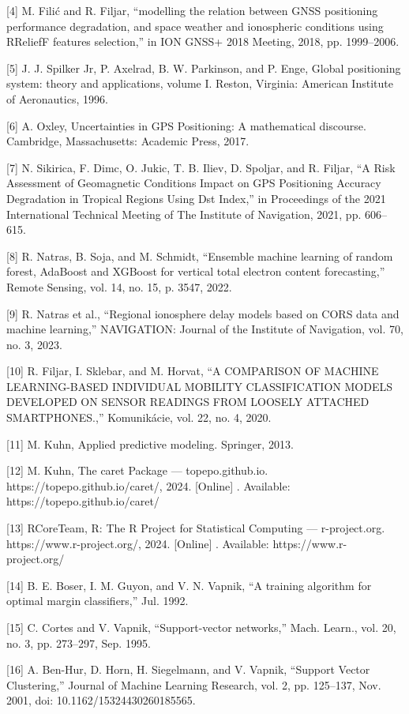 \documentclass[sn-mathphys-num]{sn-jnl}%
\begin{document}
[4] M. Filić and R. Filjar, “modelling the relation between GNSS positioning performance degradation, and space weather and ionospheric conditions using RReliefF features selection,” in ION GNSS+ 2018 Meeting, 2018, pp. 1999–2006.

[5] J. J. Spilker Jr, P. Axelrad, B. W. Parkinson, and P. Enge, Global positioning system: theory and applications, volume I. Reston, Virginia: American Institute of Aeronautics, 1996.

[6] A. Oxley, Uncertainties in GPS Positioning: A mathematical discourse. Cambridge, Massachusetts: Academic Press, 2017.

[7] N. Sikirica, F. Dimc, O. Jukic, T. B. Iliev, D. Spoljar, and R. Filjar, “A Risk Assessment of Geomagnetic Conditions Impact on GPS Positioning Accuracy Degradation in Tropical Regions Using Dst Index,” in Proceedings of the 2021 International Technical Meeting of The Institute of Navigation, 2021, pp. 606–615.

[8] R. Natras, B. Soja, and M. Schmidt, “Ensemble machine learning of random forest, AdaBoost and XGBoost for vertical total electron content forecasting,” Remote Sensing, vol. 14, no. 15, p. 3547, 2022.

[9] R. Natras et al., “Regional ionosphere delay models based on CORS data and machine learning,” NAVIGATION: Journal of the Institute of Navigation, vol. 70, no. 3, 2023.

[10] R. Filjar, I. Sklebar, and M. Horvat, “A COMPARISON OF MACHINE LEARNING-BASED INDIVIDUAL MOBILITY CLASSIFICATION MODELS DEVELOPED ON SENSOR READINGS FROM LOOSELY ATTACHED SMARTPHONES.,” Komunikácie, vol. 22, no. 4, 2020.

[11] M. Kuhn, Applied predictive modeling. Springer, 2013.

[12] M. Kuhn, The caret Package — topepo.github.io. https://topepo.github.io/caret/, 2024. [Online] . Available: https://topepo.github.io/caret/

[13] RCoreTeam, R: The R Project for Statistical Computing — r-project.org. https://www.r-project.org/, 2024. [Online] . Available: https://www.r-project.org/

[14] B. E. Boser, I. M. Guyon, and V. N. Vapnik, “A training algorithm for optimal margin classifiers,” Jul. 1992.

[15] C. Cortes and V. Vapnik, “Support-vector networks,” Mach. Learn., vol. 20, no. 3, pp. 273–297, Sep. 1995.

[16] A. Ben-Hur, D. Horn, H. Siegelmann, and V. Vapnik, “Support Vector Clustering,” Journal of Machine Learning Research, vol. 2, pp. 125–137, Nov. 2001, doi: 10.1162/15324430260185565.
\end{document}
